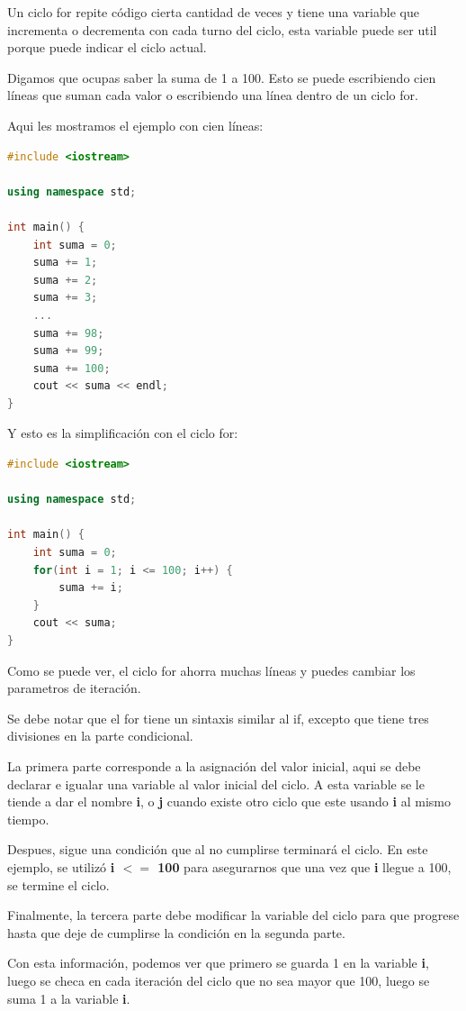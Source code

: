 \documentclass{article}
\begin{document}
Un ciclo for repite código cierta cantidad de veces y tiene una variable que incrementa o decrementa con cada turno del ciclo, esta variable puede ser util porque puede indicar el ciclo actual.

Digamos que ocupas saber la suma de 1 a 100. Esto se puede escribiendo cien líneas que suman cada valor o escribiendo una línea dentro de un ciclo for.

Aqui les mostramos el ejemplo con cien líneas:

\begin{lstlisting}[language=C++, title=Suma línea por línea]
#include <iostream>

using namespace std;

int main() {
	int suma = 0;
	suma += 1;
	suma += 2;
	suma += 3;
	...
	suma += 98;
	suma += 99;
	suma += 100;
	cout << suma << endl;
}
\end{lstlisting}

Y esto es la simplificación con el ciclo for:

\begin{lstlisting}[language=C++, title=Suma con ciclo for]
#include <iostream>

using namespace std;

int main() {
	int suma = 0;
	for(int i = 1; i <= 100; i++) {
		suma += i;
	}
	cout << suma;
}
\end{lstlisting}

Como se puede ver, el ciclo for ahorra muchas líneas y puedes cambiar los parametros de iteración.

Se debe notar que el for tiene un sintaxis similar al if, excepto que tiene tres divisiones en la parte condicional.

La primera parte corresponde a la asignación del valor inicial, aqui se debe declarar e igualar una variable al valor inicial del ciclo. A esta variable se le tiende a dar el nombre \textbf{i}, o \textbf{j} cuando existe otro ciclo que este usando \textbf{i} al mismo tiempo.

Despues, sigue una condición que al no cumplirse terminará el ciclo. En este ejemplo, se utilizó \textbf{i $<=$ 100} para asegurarnos que una vez que \textbf{i} llegue a 100, se termine el ciclo.

Finalmente, la tercera parte debe modificar la variable del ciclo para que progrese hasta que deje de cumplirse la condición en la segunda parte.

Con esta información, podemos ver que primero se guarda 1 en la variable \textbf{i}, luego se checa en cada iteración del ciclo que no sea mayor que 100, luego se suma 1 a la variable \textbf{i}.
\end{document}
